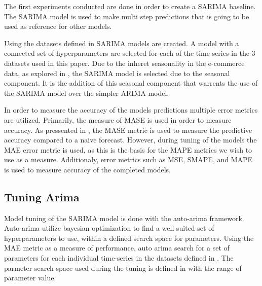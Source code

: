 \iffalse



The first experiments conducted are done in order to create a SARIMA baseline.
The SARIMA model is used to make multi step predictions that is going to be used as reference for other models.

Using the datasets defined in  SARIMA models are created.
A model with a connected set of hyperparameters are selected for each of the time-series in the 3 datasets used in this paper.
Due to the inheret seasonality in the e-commerce data, as explored in ,
the SARIMA model is selected due to the seasonal component.
It is the addition of this seasonal component that warrents the use of the SARIMA model over the simpler ARIMA model.

In order to measure the accuracy of the models predictions multiple error metrics are utilized.
Primarily, the measure of MASE is used in order to measure accuracy.
As pressented in , the MASE metric is used to measure the predictive accuracy
compared to a naive forecast.
However, during tuning of the models the MAE error metric is used, as this is the basis for the MAPE metrics we wish to use as a measure.
Additionaly, error metrics such as MSE, SMAPE, and MAPE is used to measure accuracy of the completed models.

\subsection{Tuning Arima}
Model tuning of the SARIMA model is done with the auto-arima framework.
Auto-arima utilize bayesian optimization to find a well suited set of hyperparameters to use,
within a defined search space for parameters.
Using the MAE metric as a measure of performance, auto arima search for a set of parameters for each individual time-series
in the datasets defined in .
The parmeter search space used during the tuning is defined in  with the range of parameter value.

